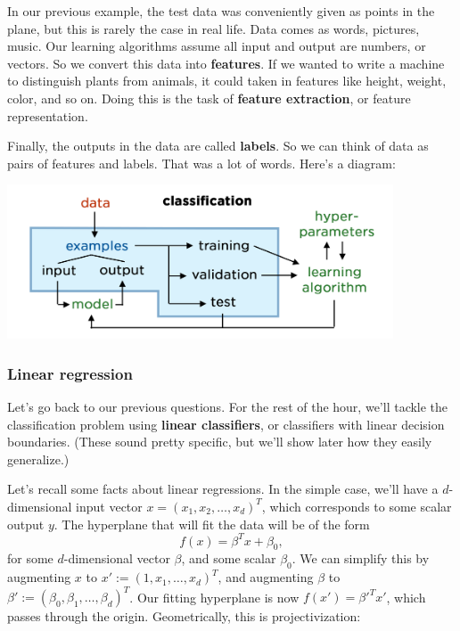 \documentclass[11pt,paper=letter]{scrartcl}
\begin{document}
In our previous example, the test data was conveniently given as points in the plane, but this is rarely the case in real life. Data comes as words, pictures, music. Our learning algorithms assume all input and output are numbers, or vectors. So we convert this data into \textbf{features}. If we wanted to write a machine to distinguish plants from animals, it could taken in features like height, weight, color, and so on. Doing this is the task of \textbf{feature extraction}, or feature representation.

Finally, the outputs in the data are called \textbf{labels}. So we can think of data as pairs of features and labels. That was a lot of words. Here's a diagram:

\begin{center}
  \includegraphics[height=1.8in]{7.png}
\end{center}

\subsubsection*{Linear regression}

Let's go back to our previous questions. For the rest of the hour, we'll tackle the classification problem using \textbf{linear classifiers}, or classifiers with linear decision boundaries. (These sound pretty specific, but we'll show later how they easily generalize.)

Let's recall some facts about linear regressions. In the simple case, we'll have a $d$-dimensional input vector $x = (x_1, x_2, \ldots, x_d)^T$, which corresponds to some scalar output $y$. The hyperplane that will fit the data will be of the form \[
  f(x) = \beta^Tx + \beta_0,
\]
for some $d$-dimensional vector $\beta$, and some scalar $\beta_0$. We can simplify this by augmenting $x$ to $x' := (1, x_1, \ldots, x_d)^T$, and augmenting $\beta$ to $\beta' := (\beta_0, \beta_1, \ldots, \beta_d)^T$. Our fitting hyperplane is now $f(x') = \beta'^Tx'$, which passes through the origin. Geometrically, this is projectivization:
\end{document}
